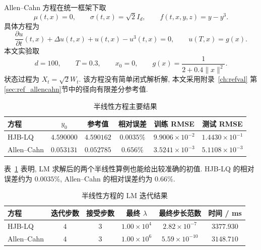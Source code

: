     Allen--Cahn 方程在统一框架下取
    \begin{equation}
      \mu(t,x)=0,\qquad
      \sigma(t,x)=\sqrt{2}I_d,\qquad
      f(t,x,y,z)=y-y^3.
      \label{eq:numerical_allencahn_coeff}
    \end{equation}
    具体方程为
    \begin{equation}
      \frac{\partial u}{\partial t}(t,x)
      + \Delta u(t,x)
      + u(t,x)-u^3(t,x)
      =0,
      \qquad
      u(T,x)=g(x).
      \label{eq:numerical_allencahn_pde}
    \end{equation}
    本文实验取
    \begin{equation}
      d=100,\qquad T=0.3,\qquad x_0=0,\qquad
      g(x)=\frac{1}{2+0.4\lVert x\rVert^2}.
      \label{eq:numerical_allencahn_terminal}
    \end{equation}
    状态过程为 $X_t=\sqrt{2}W_t$.
    该方程没有简单闭式解析解, 本文采用附录~\ref{ch:refval} 第\ref{sec:ref_allencahn}节中的径向有限差分参考值.

    \begin{table}[htbp]
      \centering
      \caption{半线性方程主要结果}
      \label{tab:nonlinear_main_results}
      \begin{tabular}{lccccc}
        \toprule
        方程 & $y_0$ & 参考值 & 相对误差 & 训练 RMSE & 测试 RMSE \\
        \midrule
        HJB-LQ & $4.590000$ & $4.590162$ & $0.0035\%$ & $9.9006\times10^{-2}$ & $1.4430\times10^{-1}$ \\
        Allen--Cahn & $0.053131$ & $0.052785$ & $0.656\%$ & $3.5241\times10^{-3}$ & $5.1108\times10^{-3}$ \\
        \bottomrule
      \end{tabular}
    \end{table}

    表~\ref{tab:nonlinear_main_results} 表明, LM 求解后的两个半线性算例也能给出较准确的初值.
    HJB-LQ 的相对误差约为 $0.0035\%$,
    Allen--Cahn 的相对误差约为 $0.66\%$.

    \begin{table}[htbp]
      \centering
      \caption{半线性方程的 LM 迭代结果}
      \label{tab:nonlinear_iteration_results}
      \begin{tabular}{lccccc}
        \toprule
        方程 & 迭代步数 & 接受步数 & 最终 $\lambda$ & 最终步长范数 & 时间 / ms \\
        \midrule
        HJB-LQ & $4$ & $3$ & $1.00\times10^{4}$ & $2.82\times10^{-7}$ & $3377.930$ \\
        Allen--Cahn & $4$ & $3$ & $1.00\times10^{6}$ & $5.59\times10^{-10}$ & $3148.710$ \\
        \bottomrule
      \end{tabular}
    \end{table}


